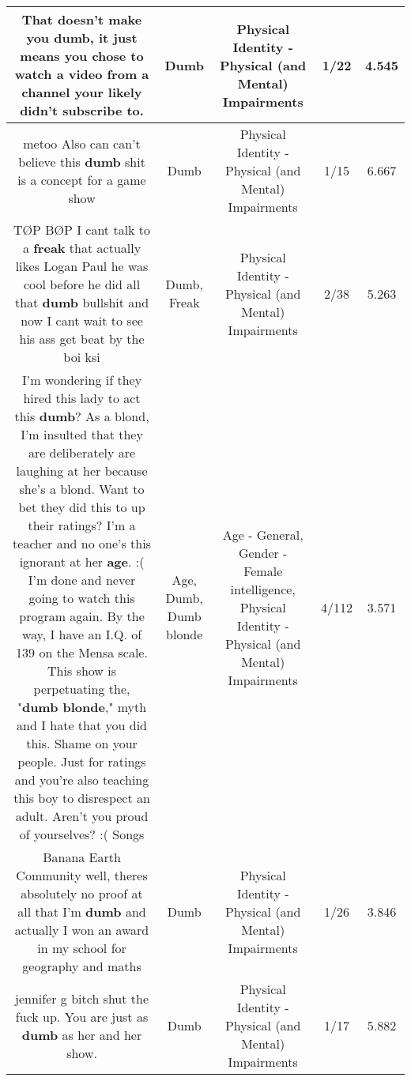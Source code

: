 \documentclass[11pt]{article}
\newlength\mylength
\begin{document}
\begin{center}
\begin{longtable}{|C{.65\mylength}|C{.30\mylength}|C{.12\mylength}|C{.12\mylength}|C{.12\mylength}|}
  \small That doesn't make you \textbf{dumb}, it just means you chose to watch a video from a channel your likely didn't subscribe to.\normalsize   & Dumb & Physical Identity - Physical (and Mental) Impairments & 1/22 & 4.545 \\  \hline
  \small metoo Also can can't believe this \textbf{dumb} shit is a concept for a game show\normalsize   & Dumb & Physical Identity - Physical (and Mental) Impairments & 1/15 & 6.667 \\  \hline
  \small TØP BØP I cant talk to a \textbf{freak} that actually likes Logan Paul he was cool before he did all that \textbf{dumb} bullshit and now I cant wait to see his ass get beat by the boi ksi\normalsize   & Dumb, Freak & Physical Identity - Physical (and Mental) Impairments & 2/38 & 5.263 \\  \hline
  \small I'm wondering if they hired this lady to act this \textbf{dumb}?  As a blond, I'm insulted that they are deliberately are laughing at her because she's a blond.  Want to bet they did this to up their ratings?  I'm a teacher and no one's this ignorant at her \textbf{age}.  :(   I'm done and never going to watch this program again.  By the way, I have an I.Q. of 139 on the Mensa scale.  This show is perpetuating the, "\textbf{d\textbf{umb} blonde}," myth and I hate that you did this.  Shame on your people.  Just for ratings and you're also teaching this boy to disrespect an adult.  Aren't you proud of yourselves?  :(   Songs\normalsize   & Age, Dumb, Dumb blonde & Age - General, Gender - Female intelligence, Physical Identity - Physical (and Mental) Impairments & 4/112 & 3.571 \\  \hline
  \small Banana Earth Community well, theres absolutely no proof at all that I'm \textbf{dumb} and actually I won an award in my school for geography and maths\normalsize   & Dumb & Physical Identity - Physical (and Mental) Impairments & 1/26 & 3.846 \\  \hline
  \small jennifer g bitch shut the fuck up. You are just as \textbf{dumb} as her and her show.\normalsize   & Dumb & Physical Identity - Physical (and Mental) Impairments & 1/17 & 5.882 \\  \hline

\end{longtable}
\end{center}
\end{document}
